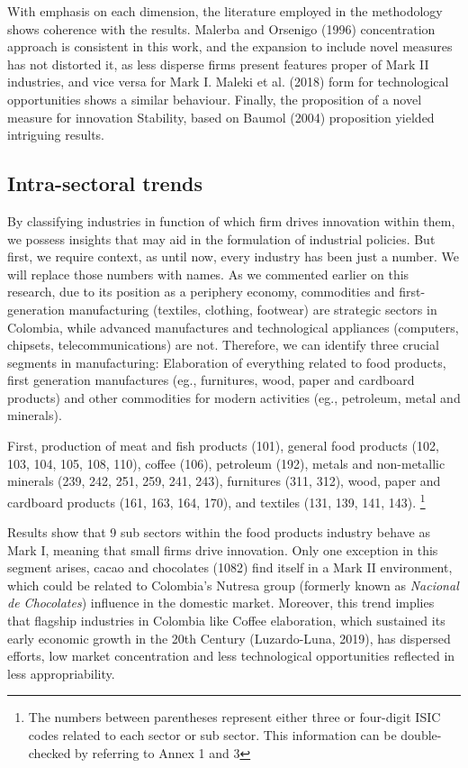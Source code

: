 \documentclass[12pt,a4paper]{article}
\begin{document}
With emphasis on each dimension, the literature employed in the methodology shows coherence with the results. Malerba and Orsenigo (1996) concentration approach is consistent in this work, and the expansion to include novel measures has not distorted it, as less disperse firms present features proper of Mark II industries, and vice versa for Mark I. Maleki et al. (2018) form for technological opportunities shows a similar behaviour. Finally, the proposition of a novel measure for innovation Stability, based on Baumol (2004) proposition yielded intriguing results. 

\subsection{Intra-sectoral trends}

By classifying industries in function of which firm drives innovation within them, we possess insights that may aid in the formulation of industrial policies. But first, we require context, as until now, every industry has been just a number. We will replace those numbers with names. As we commented earlier on this research, due to its position as a periphery economy, commodities and first-generation manufacturing (textiles, clothing, footwear) are strategic sectors in Colombia, while advanced manufactures and technological appliances (computers, chipsets, telecommunications) are not. Therefore, we can identify three crucial segments in manufacturing: Elaboration of everything related to food products, first generation manufactures (eg., furnitures, wood, paper and cardboard products) and other commodities for modern activities (eg., petroleum, metal and minerals).

First, production of meat and fish products (101), general food products (102, 103, 104, 105, 108, 110), coffee (106), petroleum (192), metals and non-metallic minerals (239, 242, 251, 259, 241, 243), furnitures (311, 312), wood, paper and cardboard products (161, 163, 164, 170), and textiles (131, 139, 141, 143). \footnote{The numbers between parentheses represent either three or four-digit ISIC codes related to each sector or sub sector. This information can be double-checked by referring to Annex 1 and 3} 

Results show that 9 sub sectors within the food products industry behave as Mark I, meaning that small firms drive innovation. Only one exception in this segment arises, cacao and chocolates (1082) find itself in a Mark II environment, which could be related to Colombia's Nutresa group (formerly known as \textit{Nacional de Chocolates}) influence in the domestic market. Moreover, this trend implies that flagship industries in Colombia like Coffee elaboration, which sustained its early economic growth in the 20th Century (Luzardo-Luna, 2019), has dispersed efforts, low market concentration and less technological opportunities reflected in less appropriability.
\end{document}
